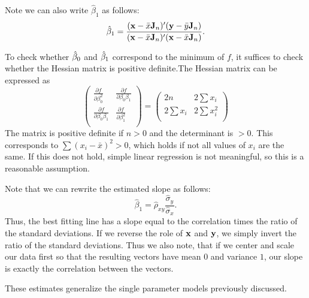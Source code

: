 Note we can also write $\hat \beta_1$ as follows:
\begin{equation}
{\hat \beta_1} = \frac{(\mathbf{x}- \bar x \mathbf{J}_n)' (\mathbf{y} - \bar y \mathbf{J}_n)}{(\mathbf{x}- \bar x \mathbf{J}_n)'(\mathbf{x}- \bar x \mathbf{J}_n)}.
\end{equation}

To check whether $\hat \beta_0$ and $\hat \beta_1$ correspond to the minimum of $f$, it suffices to check whether the Hessian matrix is positive definite.The Hessian matrix can be expressed as
$$
\left( \begin{array}{cc}
\frac{\partial f}{\partial \beta_0^2} & \frac{\partial f}{\partial \beta_0 \beta_1} \\ 
\frac{\partial f}{\partial \beta_0 \beta_1} & \frac{\partial f}{\partial \beta_1^2} \\ 
\end{array} \right)  =
\left( \begin{array}{cc}
2n & 2 \sum x_i \\ 
2 \sum x_i & 2 \sum x_i^2 \\ 
\end{array} \right)
$$
The matrix is positive definite if $n > 0$ and the  determinant is $>0$. This corresponds to $\sum (x_i - \bar x)^2 >0$, which holds if not all values of $x_i$ are the same. If this does not hold, simple linear regression is not meaningful, so this is a reasonable assumption. 

Note that we can rewrite the estimated slope as follows:
$$\hat \beta_1 = \hat \rho_{xy} \frac{\hat \sigma_y}{\hat \sigma_x}.$$
Thus, the best fitting line has a slope equal
to the correlation times the ratio of the standard deviations. If we reverse the role of $\mathbf{x}$
and $\mathbf{y}$, we simply invert the ratio of the standard deviations. Thus we also note, that if we
center and scale our data first so that the resulting vectors have mean $0$ and variance $1$,
our slope is exactly the correlation between the vectors.

\bnote
These estimates generalize the single parameter models previously discussed.
\enote

